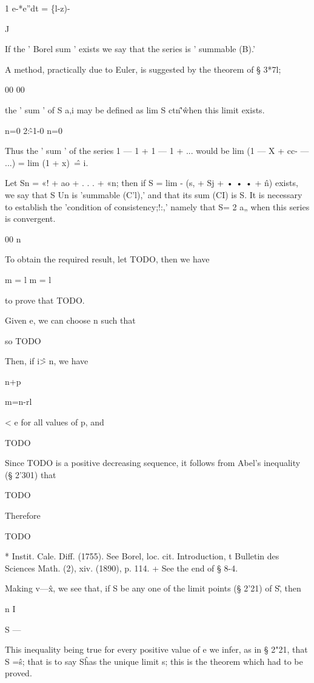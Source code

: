 1 e-*e''dt = \{l-z)-\

J

If the ' Borel sum ' exists we say that the series is ' summable (B).'

 A method, practically due
to Euler, is suggested by the theorem of § 3*7l;

00 00

the ' sum ' of S a,i may be defined as lim S ctn\^'\^ when this limit
exists.

n=0 2:\^-1-0 n=0

Thus the ' sum ' of the series 1 — 1 + 1 — 1 + ... would be lim (1 — X
+ cc- — ...) = lim (1 + x)~\^ = i.


Let Sn = «! + ao + . . . + «n; then if S = lim - (s, + Sj + • • • +
\^n) exists, we say that S Un is 'summable (C'l),' and that its sum
(CI) is S. It is necessary to establish the 'condition of
consistency;!:,' namely that S= 2 a„ when this series is convergent.

00 n

To obtain the required result, let TODO, then we have

m = l m = l

to prove that TODO.

Given e, we can choose n such that

so TODO

Then, if i\^ > n, we have

n+p


m=n-rl

< e for all values of p, and

TODO

Since TODO is a positive decreasing sequence, it follows from Abel's
inequality (§ 2'301) that

TODO

Therefore

TODO

* Instit. Cale. Diff. (1755). See Borel, loc. cit. Introduction, t
Bulletin des Sciences Math. (2), xiv. (1890), p. 114. + See the end of
§ 8-4.

%
%
Making v—\^x, we see that, if S be any one of the limit points (§
2'21) of S\^ , then

n I

S — %

This inequality being true for every positive value of e we infer, as
in § 2"21, that S =\^s; that is to say S\^ has the unique limit s;
this is the theorem which had to be proved.

